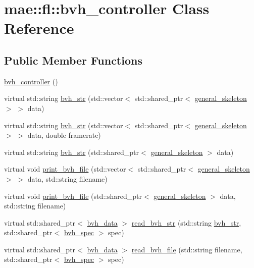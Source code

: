 \hypertarget{classmae_1_1fl_1_1bvh__controller}{\section{mae\-:\-:fl\-:\-:bvh\-\_\-controller Class Reference}
\label{classmae_1_1fl_1_1bvh__controller}
}
\subsection*{Public Member Functions}
\begin{DoxyCompactItemize}
\item 
\hyperlink{classmae_1_1fl_1_1bvh__controller_a38904c7bed56dfef82deae0169b5f5de}{bvh\-\_\-controller} ()
\item 
virtual std\-::string \hyperlink{classmae_1_1fl_1_1bvh__controller_ae7fff0274ebbd9456df0055948710711}{bvh\-\_\-str} (std\-::vector$<$ std\-::shared\-\_\-ptr$<$ \hyperlink{classmae_1_1general__skeleton}{general\-\_\-skeleton} $>$ $>$ data)
\item 
virtual std\-::string \hyperlink{classmae_1_1fl_1_1bvh__controller_a7dc209cbe8853f013b7f797c6a079d35}{bvh\-\_\-str} (std\-::vector$<$ std\-::shared\-\_\-ptr$<$ \hyperlink{classmae_1_1general__skeleton}{general\-\_\-skeleton} $>$ $>$ data, double framerate)
\item 
virtual std\-::string \hyperlink{classmae_1_1fl_1_1bvh__controller_adcab54c1d405b841331d0a84680263a7}{bvh\-\_\-str} (std\-::shared\-\_\-ptr$<$ \hyperlink{classmae_1_1general__skeleton}{general\-\_\-skeleton} $>$ data)
\item 
virtual void \hyperlink{classmae_1_1fl_1_1bvh__controller_a0762584eb4f74834d1bde00d3c131100}{print\-\_\-bvh\-\_\-file} (std\-::vector$<$ std\-::shared\-\_\-ptr$<$ \hyperlink{classmae_1_1general__skeleton}{general\-\_\-skeleton} $>$ $>$ data, std\-::string filename)
\item 
virtual void \hyperlink{classmae_1_1fl_1_1bvh__controller_a633e933c666d3dbe85a596e8c9ad122e}{print\-\_\-bvh\-\_\-file} (std\-::shared\-\_\-ptr$<$ \hyperlink{classmae_1_1general__skeleton}{general\-\_\-skeleton} $>$ data, std\-::string filename)
\item 
virtual std\-::shared\-\_\-ptr$<$ \hyperlink{classmae_1_1fl_1_1bvh__data}{bvh\-\_\-data} $>$ \hyperlink{classmae_1_1fl_1_1bvh__controller_afc644c031f7ecb9b1feb687705b5619c}{read\-\_\-bvh\-\_\-str} (std\-::string \hyperlink{classmae_1_1fl_1_1bvh__controller_ae7fff0274ebbd9456df0055948710711}{bvh\-\_\-str}, std\-::shared\-\_\-ptr$<$ \hyperlink{classmae_1_1fl_1_1bvh__spec}{bvh\-\_\-spec} $>$ spec)
\item 
virtual std\-::shared\-\_\-ptr$<$ \hyperlink{classmae_1_1fl_1_1bvh__data}{bvh\-\_\-data} $>$ \hyperlink{classmae_1_1fl_1_1bvh__controller_a355b9af004a3b11ae0036c62181567ce}{read\-\_\-bvh\-\_\-file} (std\-::string filename, std\-::shared\-\_\-ptr$<$ \hyperlink{classmae_1_1fl_1_1bvh__spec}{bvh\-\_\-spec} $>$ spec)
\end{DoxyCompactItemize}


